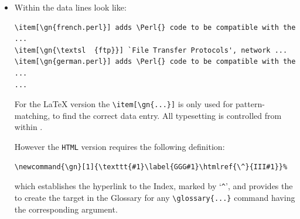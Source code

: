 \begin{itemize}
\item
Within  the data lines look like:
%
\begin{small}%
\begin{verbatim}
\item[\gn{french.perl}] adds \Perl{} code to be compatible with the ...
\item[\gn{\textsl  {ftp}}] `File Transfer Protocols', network ...
\item[\gn{german.perl}] adds \Perl{} code to be compatible with the ...
...
\end{verbatim}
\end{small}%
%
For the \LaTeX{} version the \verb|\item[\gn{...}]| is only used for pattern-matching, 
to find the correct data entry.
All typesetting is controlled from within .

However the \texttt{HTML} version requires the following definition:
%
\begin{small}%
\begin{verbatim}
\newcommand{\gn}[1]{\texttt{#1}\label{GGG#1}\htmlref{\^}{III#1}}%  
\end{verbatim}
\end{small}%
%
which establishes the hyperlink to the Index, marked by `\verb|^|', 
and provides the  to create the target in the Glossary 
for any \verb|\glossary{...}| command having the corresponding argument.%
\end{itemize}

